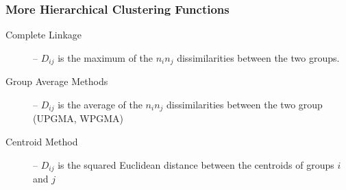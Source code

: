 \documentclass{beamer}
\begin{document}
{ 

}


\begin{frame}
  \frametitle{More Hierarchical Clustering Functions}


\begin{description}

\item[Complete Linkage] -- $D_{ij}$ is the maximum of the $n_i n_j$ dissimilarities between the two groups.

\item[Group Average Methods] -- $D_{ij}$ is the average of the $n_i n_j$  dissimilarities between the two group (UPGMA, WPGMA)

\item[Centroid Method] -- $D_{ij}$ is the squared Euclidean distance between the centroids of groups $i$ and $j$

\end{description}

\end{frame}



\end{document}
